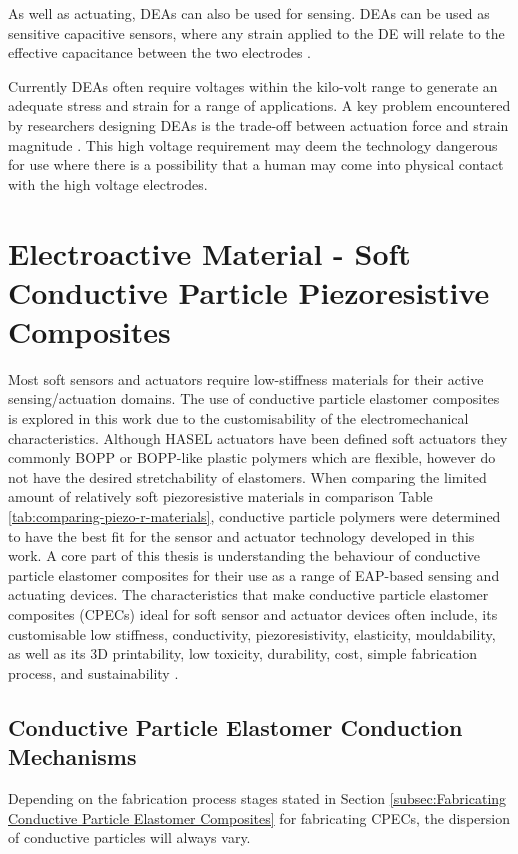 As well as actuating, DEAs can also be used for sensing. DEAs can be used as sensitive capacitive sensors, where any strain applied to the DE will relate to the effective capacitance between the two electrodes \citep{Jung2008,Goulbourne2007,Gisby2013}. 

Currently DEAs often require voltages within the kilo-volt range to generate an adequate stress and strain for a range of applications. A key problem encountered by researchers designing DEAs is the trade-off between actuation force and strain magnitude \citep{Hau2018}. This high voltage requirement may deem the technology dangerous for use where there is a possibility that a human may come into physical contact with the high voltage electrodes.


\section{Electroactive Material - Soft Conductive Particle Piezoresistive Composites}
\label{sec:Soft Piezoresistive Composites}
Most soft sensors and actuators require low-stiffness materials for their active sensing/actuation domains. The use of conductive particle elastomer composites is explored in this work due to the customisability of the electromechanical characteristics. Although HASEL actuators have been defined soft actuators they commonly BOPP or BOPP-like plastic polymers which are flexible, however do not have the desired stretchability of elastomers. When comparing the limited amount of relatively soft piezoresistive materials in comparison Table \ref{tab:comparing-piezo-r-materials}, conductive particle polymers were determined to have the best fit for the sensor and actuator technology developed in this work.
A core part of this thesis is understanding the behaviour of conductive particle elastomer composites for their use as a range of EAP-based sensing and actuating devices. The characteristics that make conductive particle elastomer composites (CPECs) ideal for soft sensor and actuator devices often include, its customisable low stiffness, conductivity, piezoresistivity, elasticity, mouldability,  as well as its 3D printability, low toxicity, durability, cost, simple fabrication process, and sustainability \cite{Chung2020,Ge2020,HindermannBischoff2001,Kim2012}.


\subsection{Conductive Particle Elastomer Conduction Mechanisms}
Depending on the fabrication process stages stated in Section \ref{subsec:Fabricating Conductive Particle Elastomer Composites} for fabricating CPECs, the dispersion of conductive particles will always vary. 


